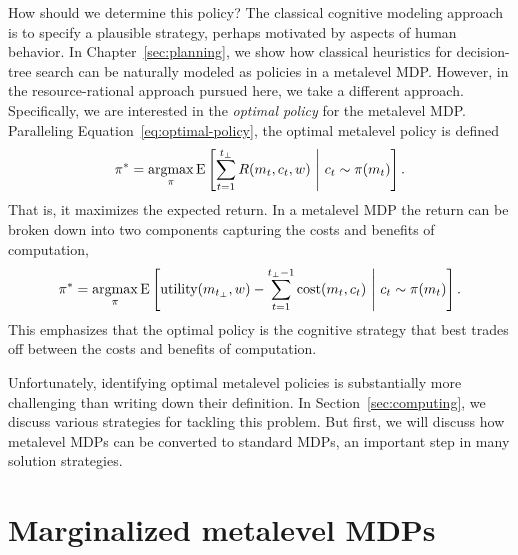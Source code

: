 How should we determine this policy? The classical cognitive modeling approach is to specify a plausible strategy, perhaps motivated by aspects of human behavior. In Chapter~\ref{sec:planning}, we show how classical heuristics for decision-tree search can be naturally modeled as policies in a metalevel MDP. However, in the resource-rational approach pursued here, we take a different approach. Specifically, we are interested in the \emph{optimal policy} for the metalevel MDP. Paralleling Equation~\ref{eq:optimal-policy}, the optimal metalevel policy is defined
%
\begin{equation}\label{eq:optimal-meta-policy}
  \pi^* = \operatorname*{argmax}_\pi \operatorname*{E} \left[ 
    \sum_{t=1}^{t_\bot} R(m_t, c_t, w)
   \ \middle\vert\ 
    c_t \sim \pi(m_t)
   \right].
\end{equation}
That is, it maximizes the expected return. In a metalevel MDP the return can be broken down into two components capturing the costs and benefits of computation,
\begin{equation}
  \pi^* = \operatorname*{argmax}_\pi \operatorname*{E} \left[ 
    \text{utility}(m_{t_\bot}, w) - \sum_{t=1}^{t_\bot-1} \text{cost}(m_t, c_t)
   \ \middle\vert\ 
    c_t \sim \pi(m_t)
   \right].
\end{equation}
This emphasizes that the optimal policy is the cognitive strategy that best trades off between the costs and benefits of computation. 

Unfortunately, identifying optimal metalevel policies is substantially more challenging than writing down their definition. In Section~\ref{sec:computing}, we discuss various strategies for tackling this problem. But first, we will discuss how metalevel MDPs can be converted to standard MDPs, an important step in many solution strategies.



\section{Marginalized metalevel MDPs}\label{sec:metamdp-marginalized}

